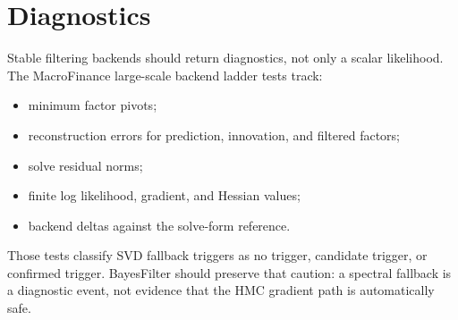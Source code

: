 \section{Diagnostics}
\label{sec:bf-stable-linear-diagnostics}

Stable filtering backends should return diagnostics, not only a scalar
likelihood.  The MacroFinance large-scale backend ladder tests track:
\begin{itemize}
  \item minimum factor pivots;
  \item reconstruction errors for prediction, innovation, and filtered factors;
  \item solve residual norms;
  \item finite log likelihood, gradient, and Hessian values;
  \item backend deltas against the solve-form reference.
\end{itemize}
Those tests classify SVD fallback triggers as no trigger, candidate trigger, or
confirmed trigger.  BayesFilter should preserve that caution: a spectral
fallback is a diagnostic event, not evidence that the HMC gradient path is
automatically safe.
